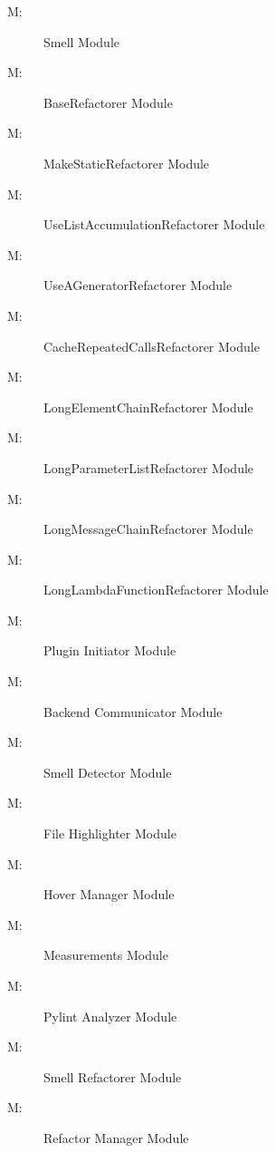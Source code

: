 \documentclass[12pt, titlepage]{article}
\newcounter{mnum}
\newcommand{\mthemnum}{M\themnum}
\begin{document}
\begin{description}
  \item [ \mthemnum \label{mSmell}:] Smell Module
  \item [ \mthemnum \label{mBR}:] BaseRefactorer Module
  \item [ \mthemnum \label{mMIMR}:] MakeStaticRefactorer Module
  \item [ \mthemnum \label{mSCLR}:] UseListAccumulationRefactorer Module
  \item [ \mthemnum \label{mUGENR}:] UseAGeneratorRefactorer Module
  \item [ \mthemnum \label{mCRC}:] CacheRepeatedCallsRefactorer Module
  \item [ \mthemnum \label{mLEC}:] LongElementChainRefactorer Module
  \item [ \mthemnum \label{mLPL}:] LongParameterListRefactorer Module
  \item [ \mthemnum \label{mLMC}:] LongMessageChainRefactorer Module
  \item [ \mthemnum \label{mLLF}:] LongLambdaFunctionRefactorer Module
  \item [ \mthemnum \label{mExe}:] Plugin Initiator Module
  \item [ \mthemnum \label{mBac}:] Backend Communicator Module
  \item [ \mthemnum \label{mDet}:] Smell Detector Module
  \item [ \mthemnum \label{mHig}:] File Highlighter Module
  \item [ \mthemnum \label{mHov}:] Hover Manager Module
  \item [ \mthemnum \label{mMeasure}:] Measurements Module
  \item [ \mthemnum \label{mPyA}:] Pylint Analyzer Module
  \item [ \mthemnum \label{mRef}:] Smell Refactorer  Module
  \item [ \mthemnum \label{mMan}:] Refactor Manager Module
\end{description}
\end{document}
